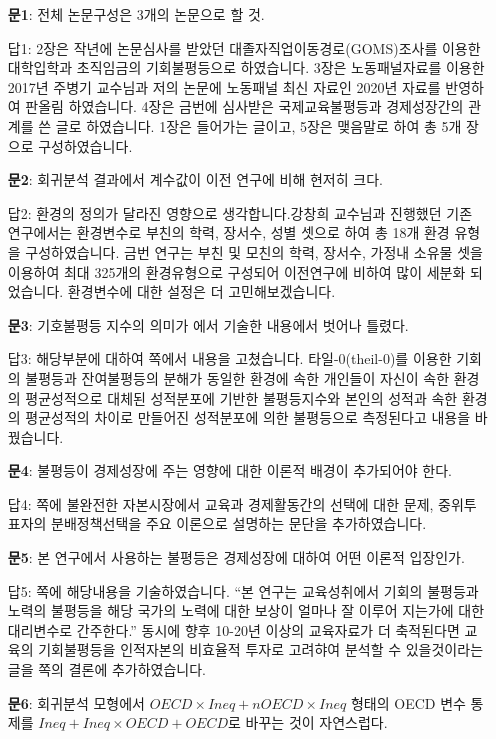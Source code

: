 \begin{itemize}
    \item[\textbf{문1}:] 전체 논문구성은 3개의 논문으로 할 것.
    \item[답1:] 2장은 작년에 논문심사를 받았던 대졸자직업이동경로(GOMS)조사를 이용한 대학입학과 초직임금의 기회불평등으로 하였습니다. 3장은 노동패널자료를 이용한 2017년 주병기 교수님과 저의 논문에 노동패널 최신 자료인 2020년 자료를 반영하여 판올림 하였습니다. 4장은 금번에 심사받은 국제교육불평등과 경제성장간의 관계를 쓴 글로 하였습니다. 1장은 들어가는 글이고, 5장은 맺음말로 하여 총 5개 장으로 구성하였습니다.
    \item[\textbf{문2}:] 회귀분석 결과에서 계수값이 이전 연구에 비해 현저히 크다.
    \item[답2:] 환경의 정의가 달라진 영향으로 생각합니다.강창희 교수님과 진행했던 기존 연구에서는 환경변수로 부친의 학력, 장서수, 성별 셋으로 하여 총 18개 환경 유형을 구성하였습니다. 금번 연구는 부친 및 모친의 학력, 장서수, 가정내 소유물 셋을 이용하여 최대 325개의 환경유형으로 구성되어 이전연구에 비하여 많이 세분화 되었습니다. 환경변수에 대한 설정은 더 고민해보겠습니다.
    \item[\textbf{문3}:] 기호불평등 지수의 의미가 \cite{fng11}에서 기술한 내용에서 벗어나 틀렸다.
    \item[답3:] 해당부분에 대하여 \pageref{eq:theil0-decompose}쪽에서 내용을 고쳤습니다. 타일-0(theil-0)를 이용한 기회의 불평등과 잔여불평등의 분해가 동일한 환경에 속한 개인들이 자신이 속한 환경의 평균성적으로 대체된 성적분포에 기반한 불평등지수와 본인의 성적과 속한 환경의 평균성적의 차이로 만들어진 성적분포에 의한 불평등으로 측정된다고 내용을 바꿨습니다. 
    \item[\textbf{문4}:] 불평등이 경제성장에 주는 영향에 대한 이론적 배경이 추가되어야 한다.
    \item[답4:] \pageref{ans4}쪽에 불완전한 자본시장에서 교육과 경제활동간의 선택에 대한 문제, 중위투표자의 분배정책선택을 주요 이론으로 설명하는 문단을 추가하였습니다.
    \item[\textbf{문5}:] 본 연구에서 사용하는 불평등은 경제성장에 대하여 어떤 이론적 입장인가.
    \item[답5:] \pageref{ans5-1}쪽에 해당내용을 기술하였습니다. ``본 연구는 교육성취에서 기회의 불평등과 노력의 불평등을 해당 국가의 노력에 대한 보상이 얼마나 잘 이루어 지는가에 대한 대리변수로 간주한다.'' 동시에 향후 10-20년 이상의 교육자료가 더 축적된다면 교육의 기회불평등을 인적자본의 비효율적 투자로 고려햐여 분석할 수 있을것이라는 글을 \pageref{ans5-2}쪽의 결론에 추가하였습니다.
    \item[\textbf{문6}:] 회귀분석 모형에서 $OECD \times Ineq + nOECD \times Ineq$ 형태의 OECD 변수 통제를 $Ineq + Ineq \times OECD + OECD$로 바꾸는 것이 자연스럽다.

\end{itemize}
